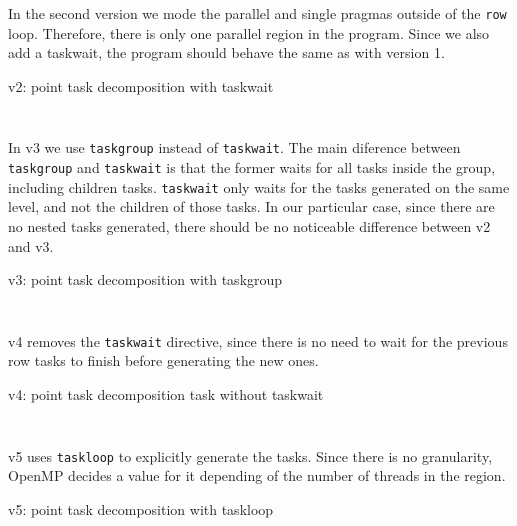 In the second version we mode the parallel and single pragmas outside of the \texttt{row} loop. Therefore, there
is only one parallel region in the program. Since we also add a taskwait, the program should behave the same as with
version 1. 

\begin{listing}[H]
    \centering
    \caption{v2: point task decomposition with taskwait}
    \inputminted[firstline=91,lastline=98]{c}{sources/mandel-omp-v2.c}
    \vspace{-2em}
    \inputminted[firstline=132,lastline=134]{c}{sources/mandel-omp-v2.c}
    \label{lst:v2} 
\end{listing}

In v3 we use \texttt{taskgroup} instead of \texttt{taskwait}. The main diference between \texttt{taskgroup}
and \texttt{taskwait} is that the former waits for all tasks inside the group, including children tasks.
\texttt{taskwait} only waits for the tasks generated on the same level, and not the children of those tasks.
In our particular case, since there are no nested tasks generated, there should be no noticeable 
difference between v2 and v3.

\begin{listing}[H]
    \centering
    \caption{v3: point task decomposition with taskgroup}
    \inputminted[firstline=91,lastline=98]{c}{sources/mandel-omp-v3.c}
    \vspace{-2em}
    \inputminted[firstline=133,lastline=135]{c}{sources/mandel-omp-v3.c}
    \label{lst:v3} 
\end{listing}

v4 removes the \texttt{taskwait} directive, since there is no need to wait for the previous row tasks
to finish before generating the new ones.

\begin{listing}[H]
    \centering
    \caption{v4: point task decomposition task without taskwait}
    \inputminted[firstline=91,lastline=98]{c}{sources/mandel-omp-v4.c}
    \vspace{-2em}
    \inputminted[firstline=131,lastline=133]{c}{sources/mandel-omp-v4.c}
    \label{lst:v4} 
\end{listing}

v5 uses \texttt{taskloop} to explicitly generate the tasks. Since there is no granularity, OpenMP
decides a value for it depending of the number of threads in the region.

\begin{listing}[H]
    \centering
    \caption{v5: point task decomposition with taskloop}
    \inputminted[firstline=91,lastline=98]{c}{sources/mandel-omp-v5.c}
    \label{lst:v5} 
\end{listing}

